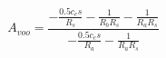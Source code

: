 \begin{equation}
A_{v oo} = \frac{- \frac{0.5 c_{c} s}{R_{s}} - \frac{1}{R_{b} R_{s}} - \frac{1}{R_{a} R_{s}}}{- \frac{0.5 c_{c} s}{R_{a}} - \frac{1}{R_{a} R_{s}}}
\end{equation}

